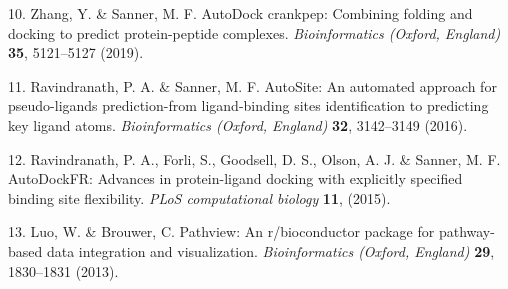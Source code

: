 \documentclass[
]{article}
\newenvironment{cslreferences}%
  {}%
  {\par}
\begin{document}
\begin{cslreferences}
\leavevmode\hypertarget{ref-AutodockCrankpZhang2019}{}%
10. Zhang, Y. \& Sanner, M. F. AutoDock crankpep: Combining folding and docking to predict protein-peptide complexes. \emph{Bioinformatics (Oxford, England)} \textbf{35}, 5121--5127 (2019).

\leavevmode\hypertarget{ref-AutositeAnAuRavind2016}{}%
11. Ravindranath, P. A. \& Sanner, M. F. AutoSite: An automated approach for pseudo-ligands prediction-from ligand-binding sites identification to predicting key ligand atoms. \emph{Bioinformatics (Oxford, England)} \textbf{32}, 3142--3149 (2016).

\leavevmode\hypertarget{ref-AutodockfrAdvRavind2015}{}%
12. Ravindranath, P. A., Forli, S., Goodsell, D. S., Olson, A. J. \& Sanner, M. F. AutoDockFR: Advances in protein-ligand docking with explicitly specified binding site flexibility. \emph{PLoS computational biology} \textbf{11}, (2015).

\leavevmode\hypertarget{ref-PathviewAnRLuoW2013}{}%
13. Luo, W. \& Brouwer, C. Pathview: An r/bioconductor package for pathway-based data integration and visualization. \emph{Bioinformatics (Oxford, England)} \textbf{29}, 1830--1831 (2013).
\end{cslreferences}
\end{document}
